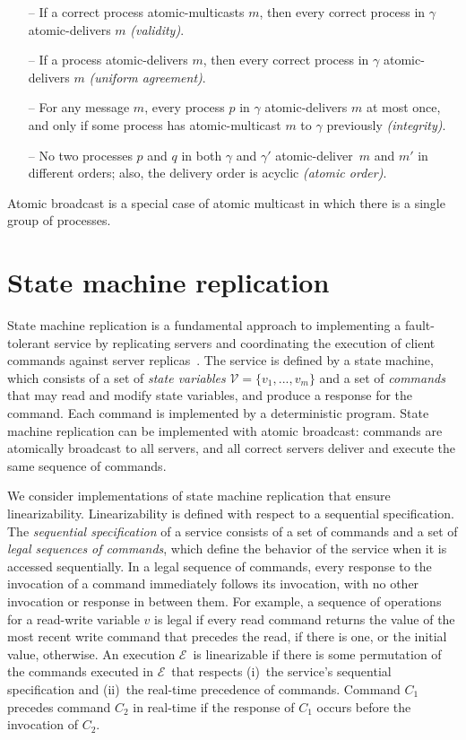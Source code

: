\documentclass[11pt]{article}
\newcommand{\ex}{$\mathcal{E}$}
\newcommand{\vvm}{\mathcal{V}}
\newcommand{\amcast}{atomic-multicast}
\newcommand{\amdel}{atomic-deliver}
\begin{document}
\begin{itemize}

    \item[--] If a correct process \amcast{}s $m$, then every correct process in $\gamma$ \amdel{}s $m$ \emph{(validity)}.

    \item[--] If a process \amdel{}s $m$, then every correct process in $\gamma$ \amdel{}s $m$ \emph{(uniform agreement)}.

    \item[--] For any message $m$, every process $p$ in $\gamma$ \amdel{}s $m$ at most once, and only if some process has \amcast{} $m$ to $\gamma$ previously \emph{(integrity)}.

    \item[--] No two processes $p$ and $q$ in both $\gamma$ and $\gamma'$ \amdel\ $m$ and $m'$ in different orders; also, the delivery order is acyclic \emph{(atomic order)}.

\end{itemize}

Atomic broadcast is a special case of atomic multicast in which there is a single group of processes.


\section{State machine replication}
\label{sec:smr}

State machine replication is a fundamental approach to implementing a fault-tolerant service by replicating servers and coordinating the execution of client commands against server replicas~\cite{Lam78, Sch90}.
The service is defined by a state machine, which consists of a set of \emph{state variables} $\vvm = \{v_1, ..., v_m\}$
and a set of \emph{commands} that may read and modify state variables, and produce a response for the command.
Each command is implemented by a deterministic program.
State machine replication can be implemented with atomic broadcast: commands are atomically broadcast to all servers, and all correct servers deliver and execute the same sequence of commands.

We consider implementations of state machine replication that ensure linearizability.
Linearizability is defined with respect to a sequential specification.
The \emph{sequential specification} of a service consists of a set of commands and a set of \emph{legal sequences of commands}, which define the behavior of the service when it is accessed sequentially.
In a legal sequence of commands, every response to the invocation of a command immediately follows its invocation, with no other invocation or response in between them.
For example, a sequence of operations for a read-write variable $v$ is legal if every read command returns the value of the most recent write command that precedes the read, if there is one, or the initial value, otherwise.
An execution \ex\ is linearizable if there is some permutation of the commands executed in \ex\ that respects (i)~the service's sequential specification and (ii)~the real-time precedence of commands.
Command $C_1$ precedes command $C_2$ in real-time if the response of $C_1$ occurs before the invocation of $C_2$.
\end{document}
